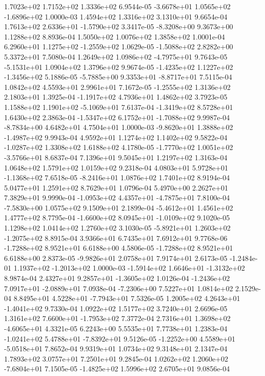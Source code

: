 1.7023e+02 1.7152e+02 1.3336e+02  6.9544e-05
-3.6678e+01  1.0565e+02 -1.6896e+02  1.0000e-03
1.4594e+02 1.3316e+02 3.1310e+01  9.6654e-04
 1.7613e+02  2.6336e+01 -1.5790e+02  3.3417e-05
-8.3208e+00  9.3673e+00  1.1288e+02  8.8936e-04
1.5050e+02 1.0076e+02 1.3858e+02  1.0001e-04
 6.2960e+01  1.1275e+02 -1.2559e+02  1.0629e-05
-1.5088e+02  2.8282e+00  5.3372e+01  7.5080e-04
 1.2649e+02  1.0986e+02 -4.7975e+01  9.7643e-05
-5.1531e+01  1.0904e+02  1.3796e+02  9.9674e-05
-1.4235e+02  1.1227e+02 -1.3456e+02  5.1886e-05
-5.7885e+00  9.3353e+01 -8.8717e+01  7.5115e-04
1.0842e+02 4.5593e+01 2.9961e+01  7.1672e-05
-1.2555e+02  1.3136e+02  2.1803e+01  1.3925e-04
-1.1917e+02  4.7936e+01  1.4862e+02  3.7923e-05
 1.1588e+02  1.1901e+02 -5.1069e+01  7.6137e-04
-1.3419e+02  8.5728e+01  1.6430e+02  2.3863e-04
-1.5347e+02  6.1752e+01 -1.7088e+02  9.9987e-04
-8.7834e+00  4.6482e+01  4.7504e+01  1.0000e-03
-9.8620e+01  1.3888e+02 -1.4987e+02  9.9943e-04
4.9592e+01 1.1274e+02 1.1402e+02  9.5822e-04
-1.0287e+02  1.3308e+02  1.6188e+02  4.1780e-05
-1.7770e+02  1.0051e+02 -3.5766e+01  8.6837e-04
7.1396e+01 9.5045e+01 1.2197e+02  1.3163e-04
1.0648e+02 1.5791e+02 1.0159e+02  9.2318e-04
 4.0803e+01  5.9728e+01 -1.1368e+02  7.6518e-05
-8.2416e+01  1.0876e+02  1.7401e+02  8.9194e-04
5.0477e+01 1.2591e+02 8.7629e+01  1.0796e-04
5.4970e+00 2.2627e+01 7.3829e+01  9.9990e-04
-1.0953e+02  4.4357e+01 -4.7875e+01  7.8100e-04
-7.5830e+00  1.0575e+02  9.1509e+01  2.1899e-04
-5.4612e+01  1.4561e+02  1.4777e+02  8.7795e-04
-1.6600e+02  8.0945e+01 -1.0109e+02  9.1020e-05
1.1298e+02 1.0414e+02 1.2760e+02  3.1030e-05
-5.8921e+01  1.2603e+02 -1.2075e+02  8.8915e-04
3.9366e+01 6.7435e+01 7.6912e+01  9.7768e-06
-1.7288e+02  8.9521e+01  6.6188e+00  4.5806e-05
-1.7288e+02  8.9521e+01  6.6188e+00  2.8373e-05
-9.9826e+01  2.0758e+01  7.9174e+01  2.6173e-05
-1.2484e-01  1.1937e+02 -1.2013e+02  1.0000e-03
-1.5914e+02  1.6646e+01 -1.3132e+02  8.9874e-04
 2.4327e+01  9.2857e+01 -1.3605e+02  1.0126e-04
-1.2436e+02  7.0917e+01 -2.0889e+01  7.0938e-04
-7.2306e+00  7.5227e+01  1.0814e+02  2.1529e-04
 8.8495e+01  4.5228e+01 -7.7943e+01  7.5326e-05
 1.2005e+02  4.2643e+01 -1.4041e+02  9.7330e-04
1.0922e+02 1.5177e+02 3.7240e+01  2.6696e-05
 1.3161e+02  7.6600e+01 -1.7953e+02  7.3772e-04
 2.7316e+01  1.3698e+02 -4.6065e+01  4.3321e-05
6.2243e+00 5.5535e+01 7.7738e+01  1.2383e-04
-1.0241e+02  5.4788e+01 -7.8392e+01  9.5126e-05
-1.2252e+00  4.5589e+01 -5.0518e+01  7.8652e-04
9.9319e+01 1.0734e+02 9.3148e+01  2.1347e-04
1.7893e+02 3.0757e+01 7.2501e+01  9.2845e-04
 1.0262e+02  1.2060e+02 -7.6804e+01  7.1505e-05
-1.4825e+02  1.5996e+02  2.6705e+01  9.0856e-04
